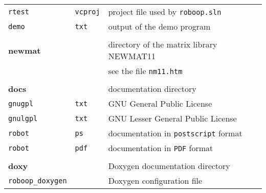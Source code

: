 \documentclass[11pt,fleqn,letterpaper]{report}
\begin{document}
{\begin{tabular}{lll}
{\tt rtest} & {\tt vcproj} & project file used by \texttt{roboop.sln} \\
{\tt demo} & {\tt txt} & output of the demo program \\ \\
{\bf newmat} & & directory of the matrix library \textsf{NEWMAT11} \\
& & see the file {\tt nm11.htm} \\ \\
{\bf docs} & & documentation directory \\
{\tt gnugpl} & {\tt txt} & GNU General Public License \\
{\tt gnulgpl} & {\tt txt} & GNU Lesser General Public License \\
{\tt robot} & {\tt ps} & documentation in {\tt postscript} format \\
{\tt robot} & {\tt pdf} & documentation in {\tt PDF} format \\ \\
{\bf doxy} & & \textsf{Doxygen} documentation directory \\
\texttt{roboop\_doxygen} & & \textsf{Doxygen} configuration file
\end{tabular}

}
\end{document}
